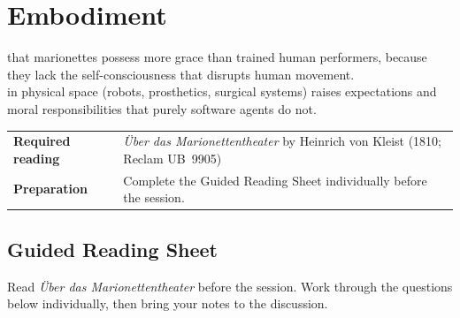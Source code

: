 \chapter{Embodiment}





 that marionettes possess more grace than trained human performers,
because they lack the self-consciousness that disrupts human movement.\\

 in physical space (robots, prosthetics, surgical systems) raises
expectations and moral responsibilities that purely software agents do not.

\vspace{3.5em}

\begin{tabular}{p{3.8cm} p{6.5cm}}
    \textbf{Required reading} &
        \textit{Über das Marionettentheater}\index{Kleist, Heinrich von}\index{Uber das Marionettentheater@\"{U}ber das Marionettentheater}\cite{kleist1810marionettentheater}
        by Heinrich von Kleist (1810; Reclam UB~9905) \\[3pt]
    \textbf{Preparation}      &
        Complete the Guided Reading Sheet individually before the session. \\
\end{tabular}

\vspace{3.5em}

\section*{Guided Reading Sheet}

\noindent Read \emph{Über das Marionettentheater} before the session. Work through the
questions below individually, then bring your notes to the discussion.

